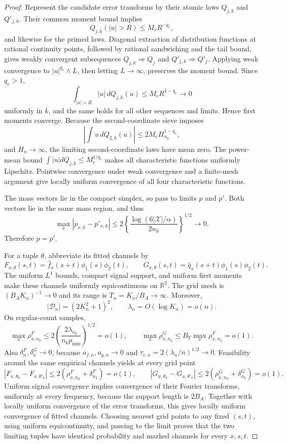 \documentclass{article}
\begin{document}
\begin{proof}
Represent the candidate error transforms by their atomic laws \(Q_{j,k}\) and \(Q'_{j,k}\). Their common moment bound implies
\[
 Q_{j,k}(|u|>R)\le M_eR^{-q_e},
\]
and likewise for the primed laws. Diagonal extraction of distribution functions at rational continuity points, followed by rational sandwiching and the tail bound, gives weakly convergent subsequences \(Q_{j,k}\Rightarrow Q_j\) and \(Q'_{j,k}\Rightarrow Q'_j\). Applying weak convergence to \(|u|^{q_e}\wedge L\), then letting \(L\to\infty\), preserves the moment bound. Since \(q_e>1\),
\[
 \int_{|u|>R}|u|\,dQ_{j,k}(u)\le M_eR^{1-q_e}\longrightarrow0
\]
uniformly in \(k\), and the same holds for all other sequences and limits. Hence first moments converge. Because the second-coordinate sieve imposes
\[
 \left|\int u\,dQ_{2,k}(u)\right|\le2M_eH_{n_k}^{1-q_e},
\]
and \(H_n\to\infty\), the limiting second-coordinate laws have mean zero. The power-mean bound \(\int|u|dQ_{j,k}\le M_e^{1/q_e}\) makes all characteristic functions uniformly Lipschitz. Pointwise convergence under weak convergence and a finite-mesh argument give locally uniform convergence of all four characteristic functions.

The mass vectors lie in the compact simplex, so pass to limits \(p\) and \(p'\). Both vectors lie in the same mass region, and thus
\[
 \max_x|p_{x,k}-p'_{x,k}|
 \le2\left\{\frac{\log(6|\mathcal X|/\alpha)}{2n_k}\right\}^{1/2}
 \longrightarrow0.
\]
Therefore \(p=p'\).

For a tuple \(\theta\), abbreviate its fitted channels by
\[
 F_{x,\theta}(s,t)=\widehat f_x(s+t)\phi_1(s)\phi_2(t),
 \qquad
 G_{x,\theta}(s,t)=\widehat q_x(s+t)\phi_1(s)\phi_2(t).
\]
The uniform \(L^1\) bounds, compact signal support, and uniform first moments make these channels uniformly equicontinuous on \(\mathbb R^2\). The grid mesh is \((B_AK_n)^{-1}\to0\) and its range is \(T_n=K_n/B_A\to\infty\). Moreover,
\[
 |\mathcal D_n|=(2K_n^2+1)^2,
 \qquad \lambda_n=O(\log K_n)=o(n).
\]
On regular-count samples,
\[
 \max_x\rho^F_{x,n_k}
 \le2\left(\frac{2\lambda_{n_k}}{n_kp_{\min}}\right)^{1/2}=o(1),
 \qquad
 \max_x\rho^G_{x,n_k}\le B_Y\max_x\rho^F_{x,n_k}=o(1).
\]
Also \(\delta^F_n,\delta^G_n\to0\), because \(a_{f,n},a_{q,n}\to0\) and \(\tau_{e,n}=2(\lambda_n/n)^{1/2}\to0\). Feasibility around the same empirical channels yields at every grid point
\[
 |F_{x,\theta_k}-F_{x,\theta'_k}|
 \le2(\rho^F_{x,n_k}+\delta^F_{n_k})=o(1),
 \qquad
 |G_{x,\theta_k}-G_{x,\theta'_k}|
 \le2(\rho^G_{x,n_k}+\delta^G_{n_k})=o(1).
\]
Uniform signal convergence implies convergence of their Fourier transforms, uniformly at every frequency, because the support length is \(2B_A\). Together with locally uniform convergence of the error transforms, this gives locally uniform convergence of fitted channels. Choosing nearest grid points to any fixed \((s,t)\), using uniform equicontinuity, and passing to the limit proves that the two limiting tuples have identical probability and marked channels for every \(x,s,t\).


\end{proof}
\end{document}
